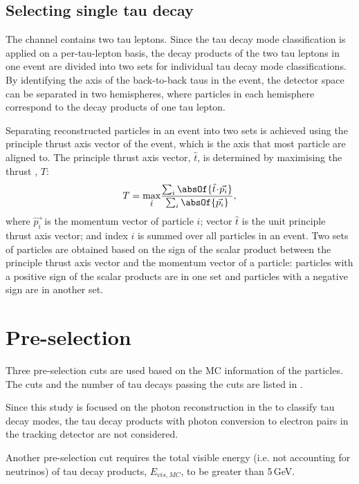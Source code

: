 \subsection{Selecting single tau decay}

The \eeToTauTau channel contains two tau leptons. Since the tau decay mode classification is applied on a per-tau-lepton basis, the decay products of the two tau leptons in one event are divided into two sets for individual tau decay mode classifications. By identifying the axis of the back-to-back taus in the  \eeToTauTau event, the detector space can be separated in two hemispheres, where particles in each hemisphere correspond to the decay products of one tau lepton.

Separating reconstructed particles in an event into two sets is achieved using the principle thrust axis vector of the event, which is the axis that most particle are aligned to. The principle thrust axis vector, $\hat{t}$, is determined by maximising the thrust \cite{PhysRevLett.39.1587}, $T$:
\begin{equation}
T = \max_{\hat{t}}\!\frac{\sum_{i}\absOf{\hat{t}\!\cdot\!\vec{p_{i}}}}{\sum_{i}\absOf{\vec{p_{i}}}},
\end{equation}
where $\vec{p_{i}}$ is the momentum vector of particle $i$;  vector $\hat{t}$ is the unit principle thrust axis vector; and index $i$ is summed over all particles in an event. Two sets of particles are obtained based on the sign of the scalar product between the principle thrust axis vector  and the momentum vector of a particle: particles with a positive sign of the scalar products are in one set and particles with a negative sign are in another set.


\section{Pre-selection}

Three pre-selection cuts are used based on the MC information of the particles. The cuts and the number of tau decays passing the cuts are listed in .

Since this study is focused on the photon reconstruction in the \ECAL to classify tau decay modes, the tau decay products with photon conversion to electron pairs in the tracking detector are not considered.

Another pre-selection cut requires the total visible energy (i.e. not accounting for neutrinos) of tau decay products, $E_{vis,MC}$, to be greater than 5\,GeV.

